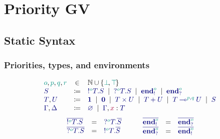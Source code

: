 \documentclass[main.tex]{subfiles}
\begin{document}
\section{Priority GV}

\subsection{Static Syntax}%
\label{sec:pgv-syntax-static}

\subsubsection{Priorities, types, and environments}
\[
\begin{array}{lcl}
  \cs{o}, \cs{p}, \cs{q}, \cs{r}
  & \in & \mathbb{N}\cup\{\cs{\pbot},\cs{\ptop}\}
  \\
  \ty{S}
  & \coloneqq & \ty{\tysend[\cs{o}]{T}{S}}
    \sep        \ty{\tyrecv[\cs{o}]{T}{S}}
    \sep        \ty{\tyends[\cs{o}]}
    \sep        \ty{\tyendr[\cs{o}]}
  \\
  \ty{T}, \ty{U}
  & \coloneqq & \ty{\tyunit}
    \sep        \ty{\tyvoid}
    \sep        \ty{\typrod{T}{U}}
    \sep        \ty{\tysum{T}{U}}
    \sep        \ty{\tylolli[\cs{p},\cs{q}]{T}{U}}
    \sep        \ty{S}
  \\
  \ty{\Gamma}, \ty{\Delta}
  & \coloneqq & \ty{\emptyenv}
    \sep        \ty{\Gamma}, \tmty{x}{T}
\end{array}
\]
\[
\begin{array}{lcl}
  \ty{\co{\tysend[\cs{o}]{T}{S}}} & = & \ty{\tyrecv[\cs{o}]{T}{\co{S}}}
  \\
  \ty{\co{\tyrecv[\cs{o}]{T}{S}}} & = & \ty{\tysend[\cs{o}]{T}{\co{S}}}
\end{array}
\qquad
\begin{array}{lcl}
  \ty{\co{\tyends[\cs{o}]}} & = & \ty{\co{\tyendr[\cs{o}]}}
  \\
  \ty{\co{\tyendr[\cs{o}]}} & = & \ty{\co{\tyends[\cs{o}]}}
\end{array}
\]
\end{document}
